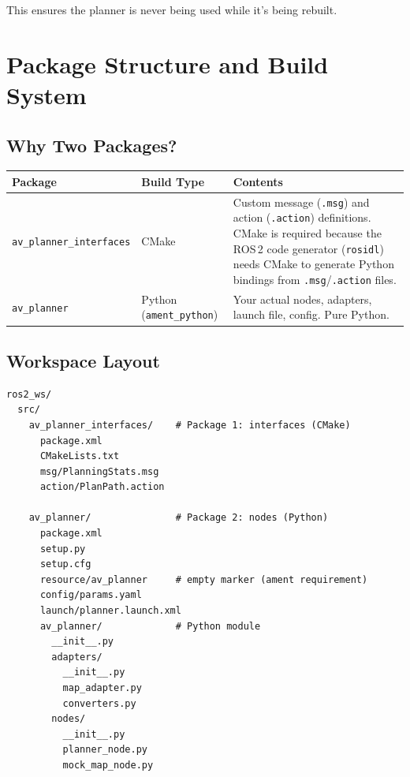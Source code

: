 \documentclass[12pt, a4paper]{article}
\begin{document}
This ensures the planner is never being used while it's being rebuilt.


\section{Package Structure and Build System}
\label{sec:packages}

\subsection{Why Two Packages?}

\begin{center}
\begin{tabular}{llp{7cm}}
    \toprule
    \textbf{Package} & \textbf{Build Type} & \textbf{Contents} \\
    \midrule
    \texttt{av\_planner\_interfaces} & CMake & Custom message (\texttt{.msg}) and action (\texttt{.action}) definitions. CMake is required because the ROS\,2 code generator (\texttt{rosidl}) needs CMake to generate Python bindings from \texttt{.msg}/\texttt{.action} files. \\[4pt]
    \texttt{av\_planner} & Python (\texttt{ament\_python}) & Your actual nodes, adapters, launch file, config. Pure Python. \\
    \bottomrule
\end{tabular}
\end{center}

\subsection{Workspace Layout}

\begin{lstlisting}[style=bash, caption={Directory structure}]
ros2_ws/
  src/
    av_planner_interfaces/    # Package 1: interfaces (CMake)
      package.xml
      CMakeLists.txt
      msg/PlanningStats.msg
      action/PlanPath.action

    av_planner/               # Package 2: nodes (Python)
      package.xml
      setup.py
      setup.cfg
      resource/av_planner     # empty marker (ament requirement)
      config/params.yaml
      launch/planner.launch.xml
      av_planner/             # Python module
        __init__.py
        adapters/
          __init__.py
          map_adapter.py
          converters.py
        nodes/
          __init__.py
          planner_node.py
          mock_map_node.py
\end{lstlisting}
\end{document}
